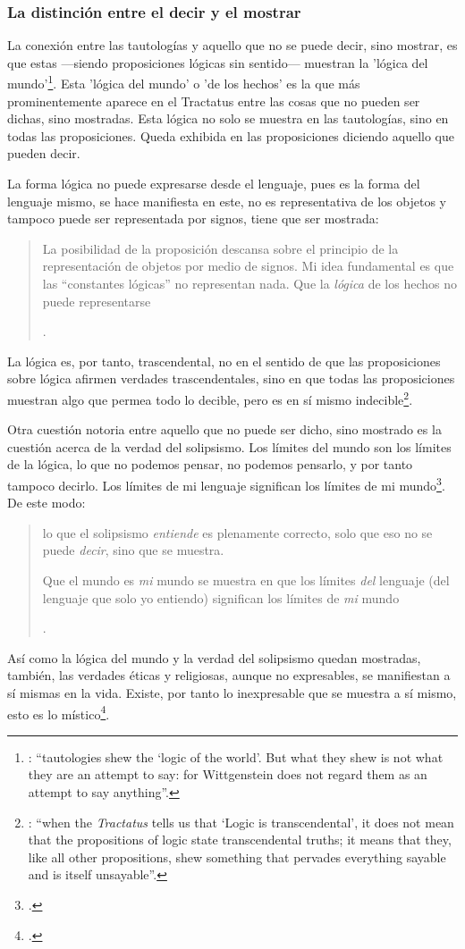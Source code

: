 \subsubsection{La distinción entre el decir y el mostrar}

La conexión entre las tautologías y aquello que no se puede decir, sino mostrar, es que estas ---siendo proposiciones lógicas sin sentido--- muestran la 'lógica del mundo'\footnote{\cite[Cf.][163]{anscombe1959iwt}: \enquote{tautologies shew the `logic of the world'. But what they shew is not what they are an attempt to say: for Wittgenstein does not regard them as an attempt to say anything}.}. Esta 'lógica del mundo' o 'de los hechos' es la que más prominentemente aparece en el Tractatus entre las cosas que no pueden ser dichas, sino mostradas. Esta lógica no solo se muestra en las tautologías, sino en todas las proposiciones. Queda exhibida en las proposiciones diciendo aquello que pueden decir.

La forma lógica no puede expresarse desde el lenguaje, pues es la forma del lenguaje mismo, se hace manifiesta en este, no es representativa de los objetos y tampoco puede ser representada por signos, tiene que ser mostrada: \blockquote[{\Cite[\S4.0312]{wittgenstein1922tractatuses}}.]{La posibilidad de la proposición descansa sobre el principio de la representación de objetos por medio de signos. Mi idea fundamental es que las \enquote{constantes lógicas} no representan nada. Que la \emph{lógica} de los hechos no puede representarse}.

La lógica es, por tanto, trascendental, no en el sentido de que las proposiciones sobre lógica afirmen verdades trascendentales, sino en que todas las proposiciones muestran algo que permea todo lo decible, pero es en sí mismo indecible\footnote{\cite[Cf.][166]{anscombe1959iwt}: \enquote{when the \emph{Tractatus} tells us that `Logic is transcendental', it does not mean that the propositions of logic state transcendental truths; it means that they, like all other propositions, shew something that pervades everything sayable and is itself unsayable}.}.

Otra cuestión notoria entre aquello que no puede ser dicho, sino mostrado es la cuestión acerca de la verdad del solipsismo. Los límites del mundo son los límites de la lógica, lo que no podemos pensar, no podemos pensarlo, y por tanto tampoco decirlo. Los límites de mi lenguaje significan los límites de mi mundo\footcite[Cf.][\S5.6 y \S5.61]{wittgenstein1922tractatuses}. De este modo: \blockquote[{\Cite[\S5.62]{wittgenstein1922tractatuses}}.]{lo que el solipsismo \emph{entiende} es plenamente correcto, solo que eso no se puede \emph{decir}, sino que se muestra.

Que el mundo es \emph{mi} mundo se muestra en que los límites \emph{del} lenguaje (del lenguaje que solo yo entiendo) significan los límites de \emph{mi} mundo}. Así como la lógica del mundo y la verdad del solipsismo quedan mostradas, también, las verdades éticas y religiosas, aunque no expresables, se manifiestan a sí mismas en la vida. Existe, por tanto lo inexpresable que se muestra a sí mismo, esto es lo místico\footcite[Cf.][\S6.522]{wittgenstein1922tractatuses}.

